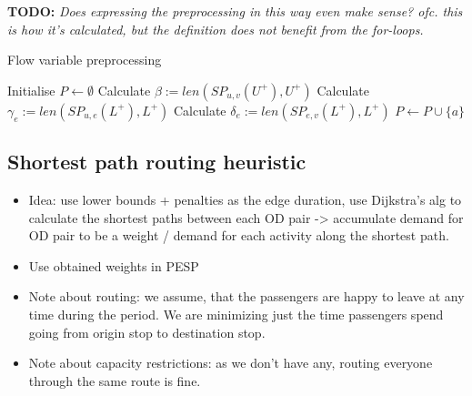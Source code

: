 \documentclass[english, 12pt, a4paper, sci, utf8, a-2b, online]{aaltothesis}
\begin{document}
{
    \color{red}
    \textbf{TODO:} \textit{Does expressing the preprocessing in this way even make sense? ofc. this is how it's calculated, but the definition does not benefit from the for-loops.}
}
\begin{algorithm}
    \caption{Flow variable preprocessing}
    \label{alg:preprocessing}
    \begin{algorithmic}
        \State Initialise $P \gets \emptyset$
        \State Calculate $\beta := len(SP_{u,v}(U^+), U^+)$
            \State Calculate $\gamma_e := len(SP_{u,e}(L^+), L^+)$
            \State Calculate $\delta_e := len(SP_{e,v}(L^+), L^+)$
        \EndFor
                \State $P \gets P \cup \{a\}$
            \EndIf
        \EndFor
    \end{algorithmic}
\end{algorithm}
    
\subsection{Shortest path routing heuristic}

\begin{itemize}
    \item Idea: use lower bounds + penalties as the edge duration, use Dijkstra's alg to calculate the shortest paths between each OD pair -> accumulate demand for OD pair to be a weight / demand for each activity along the shortest path.
    \item Use obtained weights in PESP
    \item Note about routing: we assume, that the passengers are happy to leave at any time during the period. We are minimizing just the time passengers spend going from origin stop to destination stop.
    \item Note about capacity restrictions: as we don't have any, routing everyone through the same route is fine.
\end{itemize}
\end{document}
